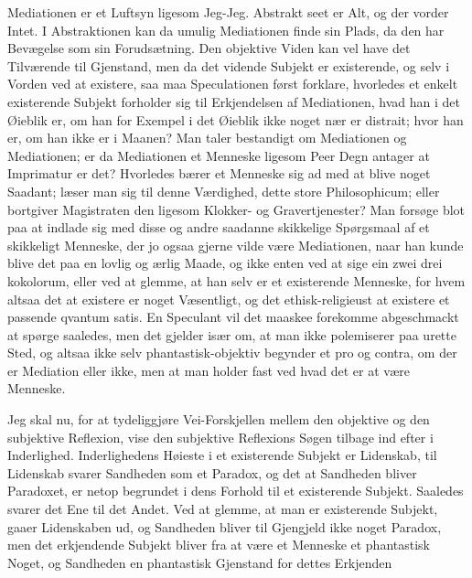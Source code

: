 \documentclass[12pt,a4paper]{article}
\begin{document}
Mediationen er et Luftsyn ligesom Jeg-Jeg. Abstrakt seet er Alt, og der vorder Intet. I Abstraktionen kan da umulig Mediationen finde sin Plads, da den har Bevægelse som sin Forudsætning. Den objektive Viden kan vel have det Tilværende til Gjenstand, men da det vidende Subjekt er existerende, og selv i Vorden ved at existere, saa maa Speculationen først forklare, hvorledes et enkelt existerende Subjekt forholder sig til Erkjendelsen af Mediationen, hvad han i det Øieblik er, om han for Exempel i det Øieblik ikke noget nær er distrait; hvor han er, om han ikke er i Maanen? Man taler bestandigt om Mediationen og Mediationen; er da Mediationen et Menneske ligesom Peer Degn antager at Imprimatur er det? Hvorledes bærer et Menneske sig ad med at blive noget Saadant; læser man sig til denne Værdighed, dette store Philosophicum; eller bortgiver Magistraten den ligesom Klokker- og Gravertjenester? Man forsøge blot paa at indlade sig med disse og andre saadanne skikkelige Spørgsmaal af et skikkeligt Menneske, der jo ogsaa gjerne vilde være Mediationen, naar han kunde blive det paa en lovlig og ærlig Maade, og ikke enten ved at sige ein zwei drei kokolorum, eller ved at glemme, at han selv er et existerende Menneske, for hvem altsaa det at existere er noget Væsentligt, og det ethisk-religieust at existere et passende qvantum satis. En Speculant vil det maaskee forekomme abgeschmackt at spørge saaledes, men det gjelder især om, at man ikke polemiserer paa urette Sted, og altsaa ikke selv phantastisk-objektiv begynder et pro og contra, om der er Mediation eller ikke, men at man holder fast ved hvad det er at være Menneske.

Jeg skal nu, for at tydeliggjøre Vei-Forskjellen mellem den objektive og den subjektive Reflexion, vise den subjektive Reflexions Søgen tilbage ind efter i Inderlighed. Inderlighedens Høieste i et existerende Subjekt er Lidenskab, til Lidenskab svarer Sandheden som et Paradox, og det at Sandheden bliver Paradoxet, er netop begrundet i dens Forhold til et existerende Subjekt. Saaledes svarer det Ene til det Andet. Ved at glemme, at man er existerende Subjekt, gaaer Lidenskaben ud, og Sandheden bliver til Gjengjeld ikke noget Paradox, men det erkjendende Subjekt bliver fra at være et Menneske et phantastisk Noget, og Sandheden en phantastisk Gjenstand for dettes Erkjenden
\end{document}

